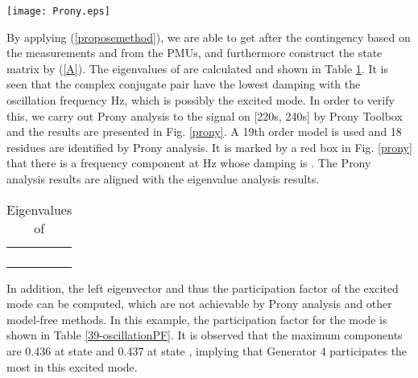\documentclass[journal]{IEEEtran}
\begin{document}
\begin{figure*}
\centering
\texttt{[image: Prony.eps]}
\caption{Prony analysis for  on [220s, 240s].} \label{prony}
\end{figure*}

By applying (\ref{proposemethod}), we are able to get  after the contingency based on the measurements  and  from the PMUs, and furthermore construct the state matrix  by (\ref{A}). The eigenvalues of  are calculated and shown in Table \ref{39-oscillationeigenvalue}. It is seen that the complex conjugate pair  have the lowest damping  with the oscillation frequency Hz, which is possibly the excited mode. In order to verify this, we carry out Prony analysis to the signal  on [220s, 240s] by Prony Toolbox \cite{Pronytoolbox} and the results are presented in Fig. \ref{prony}. A 19th order model is used and 18 residues are identified by Prony analysis. It is marked by a red box in Fig. \ref{prony} that there is a frequency component at  Hz whose damping is . The Prony analysis results are aligned with the eigenvalue analysis results.

\begin{table}[!ht]
\centering
\caption{Eigenvalues of }\label{39-oscillationeigenvalue}
\begin{tabular}{|c|c|c|c|}
\hline
& &&\\
\hline
&&&\\
\hline
& &&\\
\hline
&&&\\
\hline
&&&\\
\hline
\end{tabular}
\end{table}


In addition, the left eigenvector and thus the participation factor of the excited mode can be computed, which are not achievable by Prony analysis and other model-free methods.  In this example, the participation factor for the mode  is shown in Table \ref{39-oscillationPF}. It is observed that the maximum components are 0.436 at state  and 0.437 at state , implying that Generator 4 participates the most in this excited mode.
\end{document}
